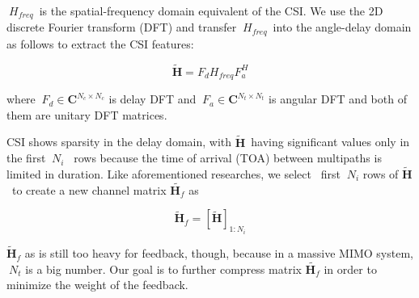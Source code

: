 \documentclass[lettersize,journal]{IEEEtran}
\begin{document}
\begin{math}\ H_{freq}\end{math} is the spatial-frequency domain equivalent of the CSI. We use the 2D discrete Fourier transform (DFT) and transfer \begin{math}\ H_{freq}\end{math} into the angle-delay domain as follows to extract the CSI features:

\begin{equation}
 \tilde{\textbf{H}}=F_{d}H_{freq}F^{H}_{a}
\end{equation}

where  \begin{math} \ F_{d}\in \textbf{C}^{N_{c}\times N_{c}}\end{math} is delay DFT and \begin{math} \ F_{a}\in \textbf{C}^{N_{t}\times N_{t}}\end{math} is angular DFT and both of them are unitary DFT matrices.

CSI shows sparsity in the delay domain, with \begin{math} \tilde{\textbf{H}} \end{math} having significant values only in the first \begin{math} \ N_{i} \end{math}  rows because the time of arrival (TOA) between multipaths is limited in duration. Like aforementioned researches, we select  first 
\begin{math} \ N_{i} \end{math} rows of \begin{math} \tilde{\textbf{H}} \end{math} to create a new channel matrix \begin{math} \tilde{\textbf{H}_{f}} \end{math} as

\begin{equation}
 	 \tilde{\textbf{H}}_{f}=\left[ \tilde{\textbf{H}} \right]_{1:N_{i}} 
\end{equation}

\begin{math} \tilde{\textbf{H}}_{f} \end{math} as is still too heavy for feedback, though, because in a massive MIMO system, \begin{math}\ N_{t}\end{math} is a big number. Our goal is to further compress matrix \begin{math} \tilde{\textbf{H}_{f}} \end{math} in order to minimize the weight of the feedback. 
\end{document}
